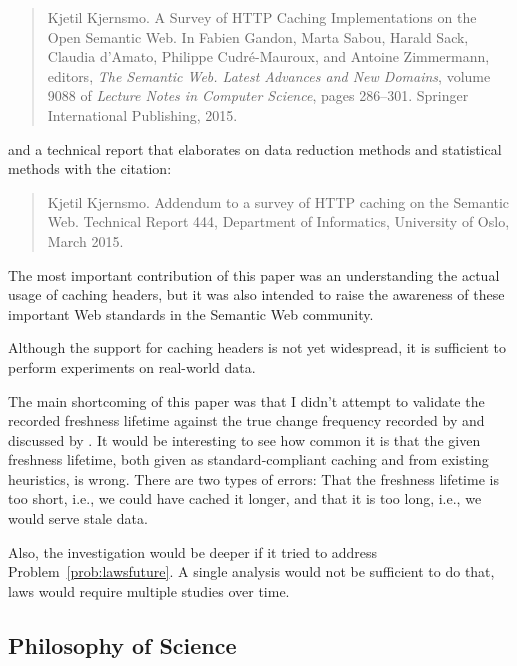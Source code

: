 \begin{quote}
Kjetil Kjernsmo.
\newblock A Survey of HTTP Caching Implementations on the Open Semantic Web.
\newblock In Fabien Gandon, Marta Sabou, Harald Sack, Claudia d’Amato,
  Philippe Cudré-Mauroux, and Antoine Zimmermann, editors, {\em The Semantic
  Web. Latest Advances and New Domains}, volume 9088 of {\em Lecture Notes in
  Computer Science}, pages 286--301. Springer International Publishing, 2015.
\end{quote}

and a technical report that elaborates on data reduction
methods and statistical methods with the citation:

\begin{quote}
Kjetil Kjernsmo.
\newblock Addendum to a survey of {HTTP} caching on the {Semantic Web}.
\newblock Technical Report 444, Department of Informatics, University of Oslo,
  March 2015.
\end{quote}

The most important contribution of this paper was an understanding the
actual usage of caching headers, but it was also intended to raise the
awareness of these important Web standards in the Semantic Web community.

Although the support for caching headers is not yet widespread, it is
sufficient to perform experiments on real-world data.

The main shortcoming of this paper was that I didn't attempt to
validate the recorded freshness lifetime against the true change
frequency recorded by \cite{dyldo2} and discussed by
\cite{Dividino2015}. It would be interesting to see how common it is
that the given freshness lifetime, both given as standard-compliant
caching and from existing heuristics, is wrong. There are two types of
errors: That the freshness lifetime is too short, i.e., we could have
cached it longer, and that it is too long, i.e., we would serve stale
data.

Also, the investigation would be deeper if it tried to address
Problem~\ref{prob:lawsfuture}. A single analysis would not be
sufficient to do that, laws would require multiple studies over time.

\subsection{Philosophy of Science}\label{sec:conphil}


